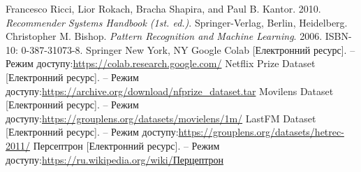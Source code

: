 \documentclass[a4paper,14pt, ukrainian]{extarticle}
\numberwithin{equation}{section}
\DeclareRobustCommand{\[}{\begin{equation}}
\DeclareRobustCommand{\]}{\end{equation}}
\begin{document}
\begin{thebibliography}{99}
    Francesco Ricci, Lior Rokach, Bracha Shapira, and Paul B. Kantor. 2010. \emph{Recommender Systems Handbook (1st. ed.)}. Springer-Verlag, Berlin, Heidelberg.
    Christopher M. Bishop. \emph{Pattern Recognition and Machine Learning}. 2006. ISBN-10: 0-387-31073-8. Springer New York, NY
    Google Colab [Електронний ресурс]. – Режим доступу:\href{https://colab.research.google.com/}{https://colab.research.google.com/}
    Netflix Prize Dataset [Електронний ресурс]. – Режим доступу:\href{https://archive.org/download/nfprize_dataset.tar}{https://archive.org/download/nfprize\_dataset.tar}
    Movilens Dataset [Електронний ресурс]. – Режим доступу:\href{https://grouplens.org/datasets/movielens/1m/}{https://grouplens.org/datasets/movielens/1m/}
    LastFM Dataset [Електронний ресурс]. – Режим доступу:\href{https://grouplens.org/datasets/hetrec-2011/}{https://grouplens.org/datasets/hetrec-2011/}
    Персептрон [Електронний ресурс]. – Режим доступу:\href{https://ru.wikipedia.org/wiki/%D0%9F%D0%B5%D1%80%D1%86%D0%B5%D0%BF%D1%82%D1%80%D0%BE%D0%BD}{https://ru.wikipedia.org/wiki/Перцептрон}
    \end{thebibliography}

\end{document}
